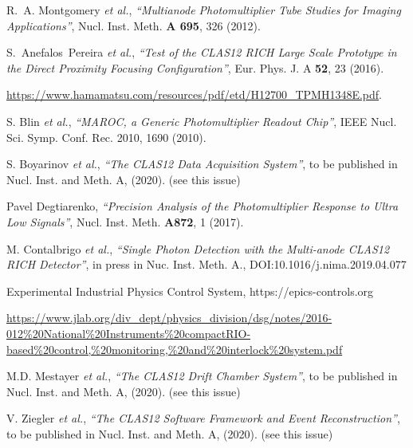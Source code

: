 \documentclass[5p,times,twocolumn]{elsarticle}
\begin{document}
\begin{thebibliography}{00}
R.~A. Montgomery {\it et al.}, {\it ``Multianode Photomultiplier Tube Studies for Imaging Applications''},
Nucl. Inst. Meth. {\bf A 695}, 326 (2012).

S.~Anefalos~Pereira {\it et al.}, {\it ``Test of the CLAS12 RICH Large Scale Prototype in the Direct Proximity Focusing Configuration''},
Eur. Phys. J. A {\bf 52}, 23 (2016).

 \url{https://www.hamamatsu.com/resources/pdf/etd/H12700\_TPMH1348E.pdf}.

 S. Blin {\it et al.}, {\it ``MAROC, a Generic Photomultiplier Readout Chip''},
IEEE Nucl. Sci. Symp. Conf. Rec. 2010, 1690 (2010).

S. Boyarinov {\it et al.}, {\it ``The CLAS12 Data Acquisition System''}, 
to be published in Nucl. Inst. and Meth. A, (2020). (see this issue)

Pavel Degtiarenko, {\it ``Precision Analysis of the Photomultiplier Response to Ultra Low Signals''}, 
Nucl. Inst. Meth. {\bf A872}, 1 (2017).

M. Contalbrigo {\it et al.}, {\it ``Single Photon Detection with the Multi-anode CLAS12 RICH Detector''}, 
in press in Nuc. Inst. Meth. A.,
DOI:10.1016/j.nima.2019.04.077

 Experimental Industrial Physics Control System, https://epics-controls.org

 \url{https://www.jlab.org/div_dept/physics_division/dsg/notes/2016-012%20National%20Instruments%20compactRIO-based%20control,%20monitoring,%20and%20interlock%20system.pdf}

M.D. Mestayer {\it et al.}, {\it ``The CLAS12 Drift Chamber System''}, to be published in Nucl. Inst.
and Meth. A, (2020). (see this issue)

V. Ziegler {\it et al.}, {\it ``The CLAS12 Software Framework and Event Reconstruction''}, to be published in Nucl. Inst.
and Meth. A, (2020). (see this issue)
  
\end{thebibliography}
\end{document}
